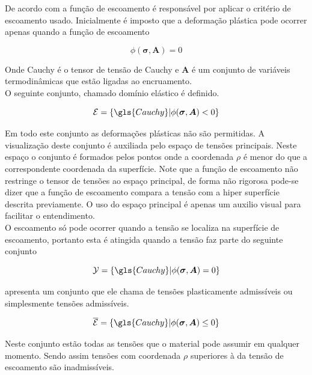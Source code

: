 De acordo com \cite{neto_peric_owens_2008} a função de escoamento é responsável por aplicar o critério de escoamento usado. Inicialmente é imposto que a deformação plástica pode ocorrer apenas quando a função de escoamento   

\begin{equation}
     \phi(\boldsymbol{\sigma}, \boldsymbol{A}) = 0 
\end{equation}

Onde \gls{Cauchy} é o tensor de tensão de Cauchy e $\boldsymbol{A}$ é um conjunto de variáveis termodinâmicas que estão ligadas ao encruamento.\\

O seguinte conjunto, chamado domínio elástico é definido. 

\begin{equation}
    \mathcal{E} = \{ \gls{Cauchy} | \phi(\boldsymbol{\sigma}, \boldsymbol{A}) < 0   \}
\end{equation}

Em todo este conjunto as deformações plásticas não são permitidas. A visualização deste conjunto é auxiliada pelo espaço de tensões principais. Neste espaço o conjunto é formados pelos pontos onde a coordenada $\rho$ é menor do que a correspondente coordenada da superfície. Note que a função de escoamento não restringe o tensor de tensões ao espaço principal, de forma não rigorosa pode-se dizer que a função de escoamento compara a tensão com a hiper superfície descrita previamente. O uso do espaço principal é apenas um auxilio visual para facilitar o entendimento. \\

O escoamento só pode ocorrer quando a tensão se localiza na superfície de escoamento, portanto esta é atingida quando a tensão faz parte do seguinte conjunto 

\begin{equation}
    \mathcal{Y} = \{ \gls{Cauchy} | \phi(\boldsymbol{\sigma}, \boldsymbol{A}) = 0   \}
\end{equation}


\cite{neto_peric_owens_2008} apresenta um conjunto que ele chama de tensões plasticamente admissíveis ou simplesmente tensões admissíveis.

\begin{equation}
    \overline{\mathcal{E}} = \{ \gls{Cauchy} | \phi(\boldsymbol{\sigma}, \boldsymbol{A}) \leq 0   \}
\end{equation}

Neste conjunto estão todas as tensões que o material pode assumir em qualquer momento. Sendo assim tensões com coordenada $\rho$ superiores à da tensão de escoamento são inadmissíveis. \par

